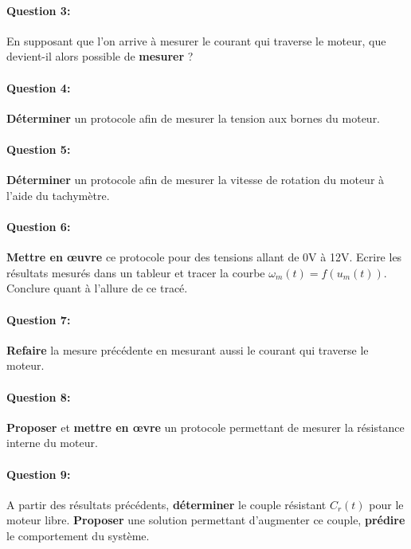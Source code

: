 \paragraph{Question 3:} En supposant que l'on arrive à mesurer le courant qui traverse le moteur, que devient-il alors possible de \textbf{mesurer} ?


\paragraph{Question 4:} \textbf{Déterminer} un protocole afin de mesurer la tension aux bornes du moteur.

\paragraph{Question 5:} \textbf{Déterminer} un protocole afin de mesurer la vitesse de rotation du moteur à l'aide du tachymètre.

\paragraph{Question 6:} \textbf{Mettre en \oe uvre} ce protocole pour des tensions allant de 0V à 12V. Ecrire les résultats mesurés dans un tableur et tracer la courbe $\omega_m(t)=f(u_m(t))$. Conclure quant à l'allure de ce tracé.

\paragraph{Question 7:} \textbf{Refaire} la mesure précédente en mesurant aussi le courant qui traverse le moteur.

\paragraph{Question 8:} \textbf{Proposer} et \textbf{mettre en \oe vre} un protocole permettant de mesurer la résistance interne du moteur.


\paragraph{Question 9:} A partir des résultats précédents, \textbf{déterminer} le couple résistant $C_r(t)$ pour le moteur libre. \textbf{Proposer} une solution permettant d'augmenter ce couple, \textbf{prédire} le comportement du système.

